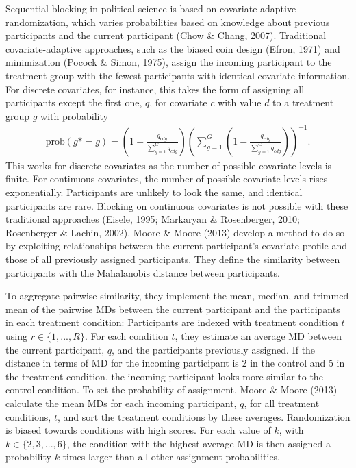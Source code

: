 \documentclass[12pt,econ]{sources/authesis}
\begin{document}
Sequential blocking in political science is based on covariate-adaptive randomization, which varies probabilities based on knowledge about previous participants and the current participant (Chow \& Chang, 2007). Traditional covariate-adaptive approaches, such as the biased coin design (Efron, 1971) and minimization (Pocock \& Simon, 1975), assign the incoming participant to the treatment group with the fewest participants with identical covariate information. For discrete covariates, for instance, this takes the form of assigning all participants except the first one, \(q\), for covariate \(c\) with value \(d\) to a treatment group \(g\) with probability
\begin{align}
\text{prob}\left(g* = g\right) = \left(1 - \frac{q_{cdg}}{\sum^G_{g = 1} q_{cdg}}\right) \left(\sum_{g = 1}^G\left(1 - \frac{q_{cdg}}{\sum^G_{g = 1} q_{cdg}}\right)\right)^{-1}.
\end{align}
This works for discrete covariates as the number of possible covariate levels is finite. For continuous covariates, the number of possible covariate levels rises exponentially. Participants are unlikely to look the same, and identical participants are rare. Blocking on continuous covariates is not possible with these traditional approaches (Eisele, 1995; Markaryan \& Rosenberger, 2010; Rosenberger \& Lachin, 2002). Moore \& Moore (2013) develop a method to do so by exploiting relationships between the current participant's covariate profile and those of all previously assigned participants. They define the similarity between participants with the Mahalanobis distance between participants.

To aggregate pairwise similarity, they implement the mean, median, and trimmed mean of the pairwise MDs between the current participant and the participants in each treatment condition: Participants are indexed with treatment condition \(t\) using \(r \in \{1,...,R\}\). For each condition \(t\), they estimate an average MD between the current participant, \(q\), and the participants previously assigned. If the distance in terms of MD for the incoming participant is 2 in the control and 5 in the treatment condition, the incoming participant looks more similar to the control condition. To set the probability of assignment, Moore \& Moore (2013) calculate the mean MDs for each incoming participant, \(q\), for all treatment conditions, \(t\), and sort the treatment conditions by these averages. Randomization is biased towards conditions with high scores. For each value of \(k\), with \(k \in \{2,3,...,6\}\), the condition with the highest average MD is then assigned a probability \(k\) times larger than all other assignment probabilities.
\end{document}
